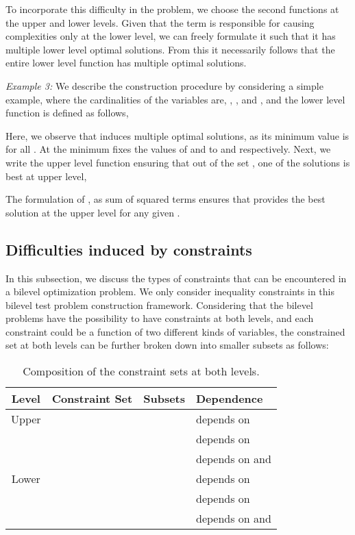 \documentclass[twoside]{article}
\begin{document}
To incorporate this difficulty in the problem, we choose the second functions at the upper and lower levels.  Given that the term  is responsible for causing complexities only at the lower level, we can freely formulate it such that it has multiple lower level optimal solutions. From this it necessarily follows that the entire lower level function has multiple optimal solutions.

\vskip 0.2cm
\textit{Example 3:} We describe the construction procedure by considering a simple example, where the cardinalities of the variables are, , ,  and , and the lower level function is defined as follows,

Here, we observe that  induces multiple optimal solutions, as its minimum value is  for all . At the minimum  fixes the values of  and  to  and  respectively. Next, we write the upper level function ensuring that out of the set , one of the solutions is best at upper level,

The formulation of , as sum of squared terms ensures that  provides the best solution at the upper level for any given .

\subsection{Difficulties induced by constraints}
In this subsection, we discuss the types of constraints that can be encountered in a bilevel optimization problem. We only consider inequality constraints in this bilevel test problem construction framework. Considering that the bilevel problems have the possibility to have constraints at both levels, and each constraint could be a function of two different kinds of variables, the constrained set at both levels can be further broken down into smaller subsets as follows:

\begin{table}[h]
\begin{center}
    \begin{tabular}{|c|l|l|l|}
        \hline
Level &        Constraint Set               &       Subsets         & Dependence \\ \hline
Upper      &   &  &  depends on \\
           &                             &                                                 &  depends on \\
           &                             &                                                 &  depends on  and \\ \hline
Lower      &   &  &  depends on \\
           &                             &                                                 &  depends on \\
           &                             &                                                 &  depends on  and \\ \hline
    \end{tabular}
\caption{Composition of the constraint sets at both levels.}
\label{tab:constraintSets}
\end{center}
\end{table}
\end{document}
